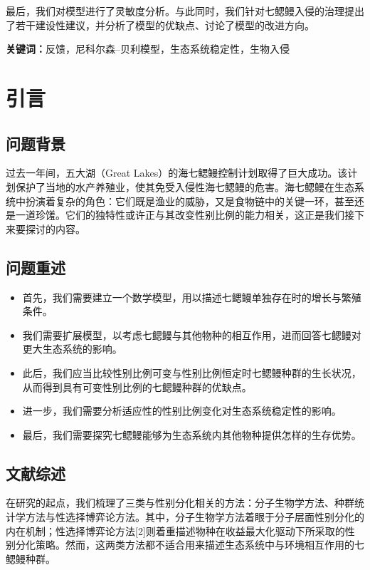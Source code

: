 \documentclass[11pt,a4paper]{ctexart}
\begin{document}
最后，我们对模型进行了灵敏度分析。与此同时，我们针对七鳃鳗入侵的治理提出了若干建设性建议，并分析了模型的优缺点、讨论了模型的改进方向。

\vspace{6pt}
\noindent\textbf{关键词：}反馈，尼科尔森–贝利模型，生态系统稳定性，生物入侵

\newpage
\pagestyle{fancy}

\section{引言}

\subsection{问题背景}

过去一年间，五大湖（Great Lakes）的海七鳃鳗控制计划取得了巨大成功。该计划保护了当地的水产养殖业，使其免受入侵性海七鳃鳗的危害。海七鳃鳗在生态系统中扮演着复杂的角色：它们既是渔业的威胁，又是食物链中的关键一环，甚至还是一道珍馐。它们的独特性或许正与其改变性别比例的能力相关，这正是我们接下来要探讨的内容。

\subsection{问题重述}

\begin{itemize}
\item 首先，我们需要建立一个数学模型，用以描述七鳃鳗单独存在时的增长与繁殖条件。
\item 我们需要扩展模型，以考虑七鳃鳗与其他物种的相互作用，进而回答七鳃鳗对更大生态系统的影响。
\item 此后，我们应当比较性别比例可变与性别比例恒定时七鳃鳗种群的生长状况，从而得到具有可变性别比例的七鳃鳗种群的优缺点。
\item 进一步，我们需要分析适应性的性别比例变化对生态系统稳定性的影响。
\item 最后，我们需要探究七鳃鳗能够为生态系统内其他物种提供怎样的生存优势。
\end{itemize}

\subsection{文献综述}

在研究的起点，我们梳理了三类与性别分化相关的方法：分子生物学方法、种群统计学方法与性选择博弈论方法。其中，分子生物学方法着眼于分子层面性别分化的内在机制；性选择博弈论方法[2]则着重描述物种在收益最大化驱动下所采取的性别分化策略。然而，这两类方法都不适合用来描述生态系统中与环境相互作用的七鳃鳗种群。
\end{document}
